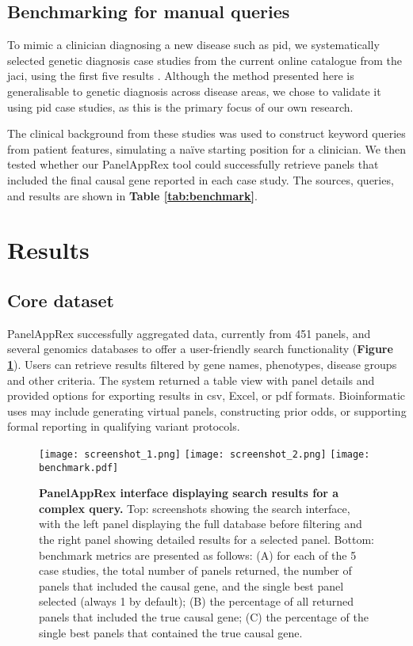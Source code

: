 \subsection{Benchmarking for manual queries}
\noindent
To mimic a clinician diagnosing a new disease such as \ac{pid}, we systematically selected genetic diagnosis case studies from the current online catalogue from the \ac{jaci}, using the first five results  \cite{arruda_genetic_2015, 
mcaleer_severe_2015,
verhoeven_hematopoietic_2022,
magerus-chatinet_autoimmune_2013,
sharfe_fatal_2014}. 
Although the method presented here is generalisable to genetic diagnosis across disease areas, we chose to validate it using \ac{pid} case studies, as this is the primary focus of our own research.

The clinical background from these studies was used to construct keyword queries from patient features, simulating a naïve starting position for a clinician.
We then tested whether our PanelAppRex tool could successfully retrieve panels that included the final causal gene reported in each case study. 
The sources, queries, and results are shown in \textbf{Table \ref{tab:benchmark}}. 

\section{Results}
\noindent
\subsection{Core dataset}
PanelAppRex successfully aggregated data, currently from 451 panels, and several genomics databases to offer a user-friendly search functionality (\textbf{Figure \ref{fig:performance}}).
Users can retrieve results filtered by gene names, phenotypes, disease groups and other criteria. 
The system returned a table view with panel details and provided options for exporting results in \ac{csv}, Excel, or \ac{pdf} formats.
Bioinformatic uses may include generating virtual panels, constructing prior odds, or supporting formal reporting in qualifying variant protocols.

\begin{figure}[ht]
    \centering
    \texttt{[image: screenshot\_1.png]}
    \texttt{[image: screenshot\_2.png]}    
    \texttt{[image: benchmark.pdf]}    
\caption{\textbf{PanelAppRex interface displaying search results for a complex query.} Top: screenshots showing the search interface, with the left panel displaying the full database before filtering and the right panel showing detailed results for a selected panel. Bottom: benchmark metrics are presented as follows: (A) for each of the 5 case studies, the total number of panels returned, the number of panels that included the causal gene, and the single best panel selected (always 1 by default); (B) the percentage of all returned panels that included the true causal gene; (C) the percentage of the single best panels that contained the true causal gene.}
    \label{fig:performance}
\end{figure}

